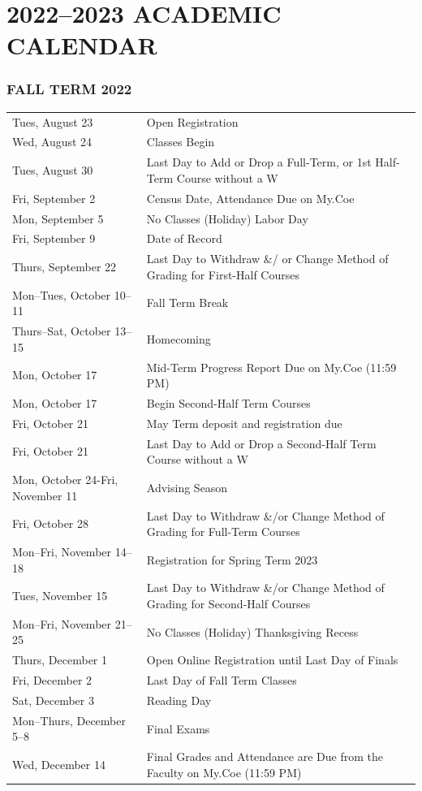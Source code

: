 \documentclass[
  letterpaper,
]{scrbook}
\renewcommand\toprule[2]\relax
\renewcommand\bottomrule[2]\relax
\begin{document}
\hypertarget{sec-academic-calenar}{%
\chapter{2022--2023 ACADEMIC CALENDAR}\label{sec-academic-calenar}}

\hypertarget{fall-term-2022}{%
\subsection{FALL TERM 2022}\label{fall-term-2022}}

\begin{longtable}[]{@{}
  >{\raggedright\arraybackslash}p{}
  >{\raggedleft\arraybackslash}p{}@{}}
\toprule\noalign{}
\endhead
\bottomrule\noalign{}
\endlastfoot
Tues, August 23 & Open Registration \\
Wed, August 24 & Classes Begin \\
Tues, August 30 & Last Day to Add or Drop a Full-Term, or 1st Half-Term
Course without a W \\
Fri, September 2 & Census Date, Attendance Due on My.Coe \\
Mon, September 5 & No Classes (Holiday) Labor Day \\
Fri, September 9 & Date of Record \\
Thurs, September 22 & Last Day to Withdraw \&/ or Change Method of
Grading for First-Half Courses \\
Mon--Tues, October 10--11 & Fall Term Break \\
Thurs--Sat, October 13--15 & Homecoming \\
Mon, October 17 & Mid-Term Progress Report Due on My.Coe (11:59 PM) \\
Mon, October 17 & Begin Second-Half Term Courses \\
Fri, October 21 & May Term deposit and registration due \\
Fri, October 21 & Last Day to Add or Drop a Second-Half Term Course
without a W \\
Mon, October 24-Fri, November 11 & Advising Season \\
Fri, October 28 & Last Day to Withdraw \&/or Change Method of Grading
for Full-Term Courses \\
Mon--Fri, November 14--18 & Registration for Spring Term 2023 \\
Tues, November 15 & Last Day to Withdraw \&/or Change Method of Grading
for Second-Half Courses \\
Mon--Fri, November 21--25 & No Classes (Holiday) Thanksgiving Recess \\
Thurs, December 1 & Open Online Registration until Last Day of Finals \\
Fri, December 2 & Last Day of Fall Term Classes \\
Sat, December 3 & Reading Day \\
Mon--Thurs, December 5--8 & Final Exams \\
Wed, December 14 & Final Grades and Attendance are Due from the Faculty
on My.Coe (11:59 PM) \\
\end{longtable}
\end{document}
